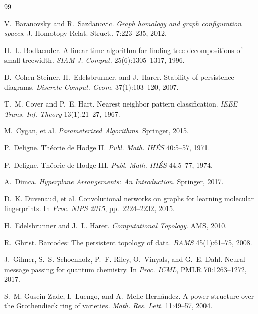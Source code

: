 \documentclass[runningheads]{llncs}
\begin{document}
\begin{thebibliography}{99}

V.~Baranovsky and R.~Sazdanovic.
\newblock \emph{Graph homology and graph configuration spaces}.
\newblock J. Homotopy Relat. Struct., 7:223--235, 2012.

H.~L. Bodlaender.
\newblock A linear-time algorithm for finding tree-decompositions of small treewidth.
\newblock \emph{SIAM J. Comput.} 25(6):1305--1317, 1996.

D.~Cohen-Steiner, H.~Edelsbrunner, and J.~Harer.
\newblock Stability of persistence diagrams.
\newblock \emph{Discrete Comput. Geom.} 37(1):103--120, 2007.

T.~M. Cover and P.~E. Hart.
\newblock Nearest neighbor pattern classification.
\newblock \emph{IEEE Trans. Inf. Theory} 13(1):21--27, 1967.

M.~Cygan, et al.
\newblock \emph{Parameterized Algorithms}.
\newblock Springer, 2015.

P.~Deligne.
\newblock Th\'eorie de Hodge II.
\newblock \emph{Publ. Math. IH\'ES} 40:5--57, 1971.

P.~Deligne.
\newblock Th\'eorie de Hodge III.
\newblock \emph{Publ. Math. IH\'ES} 44:5--77, 1974.

A.~Dimca.
\newblock \emph{Hyperplane Arrangements: An Introduction}.
\newblock Springer, 2017.

D.~K. Duvenaud, et al.
\newblock Convolutional networks on graphs for learning molecular fingerprints.
\newblock In \emph{Proc. NIPS 2015}, pp.~2224--2232, 2015.

H.~Edelsbrunner and J.~L. Harer.
\newblock \emph{Computational Topology}.
\newblock AMS, 2010.

R.~Ghrist.
\newblock Barcodes: The persistent topology of data.
\newblock \emph{BAMS} 45(1):61--75, 2008.

J.~Gilmer, S.~S. Schoenholz, P.~F. Riley, O.~Vinyals, and G.~E. Dahl.
\newblock Neural message passing for quantum chemistry.
\newblock In \emph{Proc. ICML}, PMLR 70:1263--1272, 2017.

S.~M. Gusein-Zade, I.~Luengo, and A.~Melle-Hern\'andez.
\newblock A power structure over the Grothendieck ring of varieties.
\newblock \emph{Math. Res. Lett.} 11:49--57, 2004.


\end{thebibliography}
\end{document}
